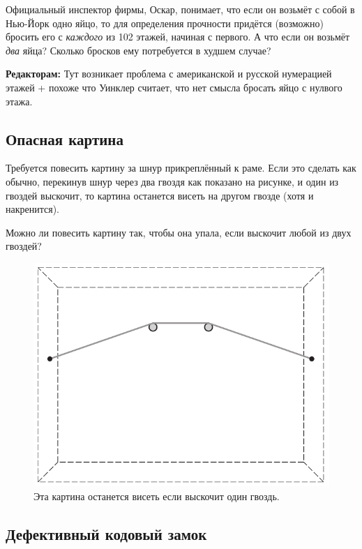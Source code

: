 Официальный инспектор фирмы, Оскар, понимает, что если он возьмёт с собой в Нью-Йорк одно яйцо,
то для определения прочности придётся (возможно) бросить его с \emph{каждого} из 102 %
этажей, начиная с первого.
А что если он возьмёт \emph{два} яйца?
Сколько бросков ему потребуется в худшем случае?

\begin{addedbytheeditors}
\textbf{Редакторам:}
Тут возникает проблема с американской и русской нумерацией этажей + похоже что Уинклер считает, что нет смысла бросать яйцо с нулвого этажа.
\end{addedbytheeditors}


\subsection*{Опасная картина}

Требуется повесить картину за шнур прикреплённый к раме.
Если это сделать как обычно, перекинув шнур через два гвоздя как показано на рисунке, и один из гвоздей выскочит, то картина останется висеть на другом гвозде (хотя и накренится).

Можно ли повесить картину так, чтобы она упала, если выскочит любой из двух гвоздей?

\begin{figure}[h!]
\centering
\includegraphics[scale=0.5]{pics/kartina1}
\caption{Эта картина останется висеть если выскочит один гвоздь.}
\end{figure}

\subsection*{Дефективный кодовый замок}

